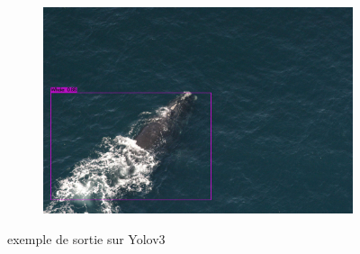 \documentclass[12pt,a4paper]{report}
\begin{document}
\begin{spacing}{1.5}
\begin{figure}[H]
\begin{subfigure}{0.45\textwidth}
\includegraphics[width=\linewidth]{figures/sortie/yolov3/predictionsall2.jpg}
\end{subfigure}
\caption{exemple de sortie sur Yolov3}
\end{figure}


\end{spacing}
\end{document}
